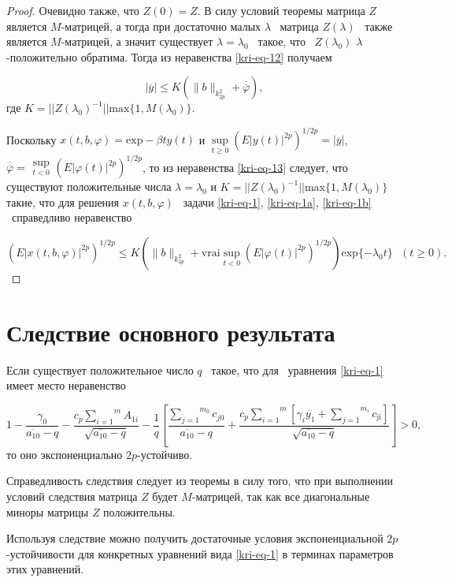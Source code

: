\begin{proof}
Очевидно также, что  $Z(0)=Z$. В силу условий теоремы матрица  $Z$ является  $M$-\linebreak матрицей, а тогда при достаточно
малых  $\lambda $ \ матрица  $Z(\lambda )$ \ также является  $M${}-матрицей, а значит существует  $\lambda =\lambda _0$
\ такое, что \  $Z(\lambda _0)$ $\lambda$-положительно обратима. Тогда из неравенства \eqref{kri-eq-12} получаем

\begin{equation}\label{kri-eq-13}
	|\overline y|\le K(\|b\|_{k_{2p}^2}+\overline{\overline{\varphi
	}}),
\end{equation}
где  $K=||Z(\lambda _0)^{-1}||\text{max}\{1,M(\lambda _0)\}.$

Поскольку  $x(t,b,\varphi )=\text{exp}-\beta ty(t)$  и   $\underset{t\ge
0}\sup\left(E|y(t)|^{2p}\right)^{1/2p}=|\overline y|$,  $\overline{\overline{\varphi
}}=\begin{matrix}\sup\limits_{t<0}\end{matrix}\left(E|\varphi (t)|^{2p}\right)^{1/2p}$, то из неравенства \eqref{kri-eq-13} следует,
что существуют положительные числа  $\lambda =\lambda _0$  и \linebreak  $K=||Z(\lambda _0)^{-1}||\text{max}\{1,M(\lambda _0)\}$
такие, что для решения  $x(t,b,\varphi )$ \ задачи \eqref{kri-eq-1}, \eqref{kri-eq-1a}, \eqref{kri-eq-1b} \ справедливо неравенство

\begin{equation*}
(E|x(t,b,\varphi )|^{2p})^{1/2p}\le
K\left(\|b\|_{k_{2p}^2}+\mathrm{vrai} \sup\limits_{t<0}(E|\varphi(t)|^{2p})^{1/2p}\right)\text{exp}\{-\lambda _0 t\}\text{  }(t\ge 0).
\end{equation*}
\end{proof}

\section{Следствие основного результата}

\begin{corollary}
Если существует положительное число  $q$ \ такое, что для \ уравнения \eqref{kri-eq-1} имеет место
неравенство

\begin{equation}\label{kri-eq-14}
	1-\frac{\gamma _0}{\overline{a_{10}}-q}-\frac{c_p\overset m{\underset{i=1}{\sum
		}}A_{1i}}{\sqrt{\overline{a_{10}}-q}}-\frac 1 q\left[\frac{\overset{m_0}{\underset{j=1}{\sum
		}}c_{\mathit{j0}}}{\overline{a_{10}}-q}+\frac{c_p\overset m{\underset{i=1}{\sum }}\left[\gamma
		_i\overline{y_1}+\overset{m_i}{\underset{j=1}{\sum
		}}c_{\text{ji}}\right]}{\sqrt{\overline{a_{10}}-q}}\right]>0,
\end{equation}
то оно экспоненциально  $2p${}-устойчиво.
\end{corollary}

Справедливость следствия следует из теоремы в силу того, что при выполнении условий следствия матрица  $Z$
будет  $M${}-матрицей, так как все диагональные миноры матрицы  $Z$
положительны.

Используя следствие можно получить достаточные условия экспоненциальной  $2p$-устойчивости для конкретных уравнений
вида \eqref{kri-eq-1} в терминах параметров этих уравнений. 